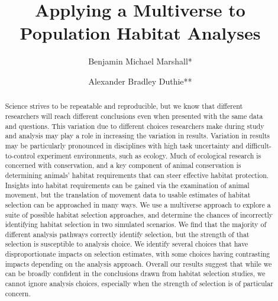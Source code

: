 \documentclass[10pt,a4paper]{article}
\begin{document}
\pagestyle{fancy}

\title{Applying a Multiverse to Population Habitat Analyses}
\author[1]{Benjamin Michael Marshall*}
\author[1]{Alexander Bradley Duthie**}


\maketitle
\thispagestyle{fancy}

\begin{abstract}

Science strives to be repeatable and reproducible, but we know that different researchers will reach different conclusions even when presented with the same data and questions. This variation due to different choices researchers make during study and analysis may play a role in increasing the variation in results. Variation in results may be particularly pronounced in disciplines with high task uncertainty and difficult-to-control experiment environments, such as ecology. Much of ecological research is concerned with conservation, and a key component of animal conservation is determining animals' habitat requirements that can steer effective habitat protection. Insights into habitat requirements can be gained via the examination of animal movement, but the translation of movement data to usable estimates of habitat selection can be approached in many ways. We use a multiverse approach to explore a suite of possible habitat selection approaches, and determine the chances of incorrectly identifying habitat selection in two simulated scenarios. We find that the majority of different analysis pathways correctly identify selection, but the strength of that selection is susceptible to analysis choice. We identify several choices that have disproportionate impacts on selection estimates, with some choices having contrasting impacts depending on the analysis approach. Overall our results suggest that while we can be broadly confident in the conclusions drawn from habitat selection studies, we cannot ignore analysis choices, especially when the strength of selection is of particular concern.

\end{abstract}
\end{document}
